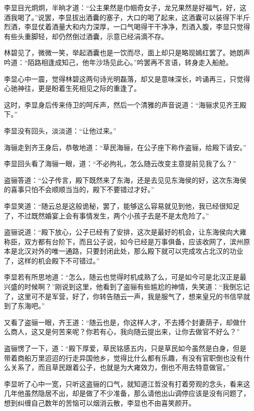 李显目光炯炯，半晌才道：“公主果然是巾帼奇女子，龙兄果然是好福气，好，这酒我喝了。”说罢，李显拔出酒囊的塞子，大口的喝了起来，这酒囊可以装得下半斤烈酒，李显仗着酒量大和内力深厚，一口气喝得干干净净，烈酒入腹，李显只觉得有些头重脚轻，却仍然倒过酒囊，示意已经涓滴不存。

林碧见了，微微一笑，举起酒囊也是一饮而尽，面上却只是略现嫣红罢了。她朗声吟道：“陌路相逢成知己，他年沙场见此心。”吟罢再不言语，转身走入船舱。

李显心中一震，觉得林碧这两句诗光明磊落，却又是意味深长，吟诵再三，只觉得心驰神往，更是盼着生死相见之际的重逢了。

这时，李显身后传来侍卫的呵斥声，然后一个清雅的声音说道：“海骊求见齐王殿下。”

李显没有回头，淡淡道：“让他过来。”

海骊走到齐王身后，恭敬地道：“草民海骊，在公子座下称作盗骊，给殿下请安。”

李显回头看了海骊一眼，道：“不必拘礼，怎么随云改变主意提前见我了么？”

盗骊答道：“公子传言，殿下既然来了东海，还是去见见东海侯的好，这次东海侯的喜事只怕不会顺顺当当的，殿下不要错过才好。”

李显笑道：“随云总是这般诡秘，罢了，能够这么容易就见到他，我已经很知足了，不过既然婚宴上会有事情发生，两个小孩子去是不是太危险了。”

盗骊说道：“殿下放心，公子已经有了安排，这次是最好的机会，让东海侯向大雍称臣，双方都有台阶下，而且公子说，如今已经是万事俱备，应该收网了，滨州原本是北汉对外的唯一通路，只要封闭此处，那么殿下就可以完成攻占北汉的功业了，这样的机会殿下不可错过。”

李显若有所思地道：“怎么，随云也觉得时机成熟了么，可是如今可是北汉正是最兴盛的时候啊？”刚说到这里，他看到了盗骊有些尴尬的神情，失笑道：“我倒忘记了，这里可不是军营，好了，你转告随云一声，我是服气了，想来皇兄的书信早就到了东海吧。”

又看了盗骊一眼，齐王道：“随云也是，你这样人才，不去搏个封妻荫子，却做什么商人，这又是何苦来呢？你若有心，我向随云提出来，让你去做官不好么？”

盗骊愣了一下，道：“殿下厚爱，草民铭感五内，只是草民如今虽然是白身，但是带着商船万里迢迢的行走异国他乡，觉得比什么都有乐趣，有没有官职倒也没有什么关系了，而且草民跟着公子，也就是为大雍效力，倒也不用去特意做官。”

李显听了心中一宽，只听这盗骊的口气，就知道江哲没有打着旁观的念头，看来这几年他虽然隐居不出，却是做了不少准备，那么请他出山调停应该是没有问题了，想到纠缠自己数年的苦恼可以烟消云散，李显也不由喜笑颜开。

